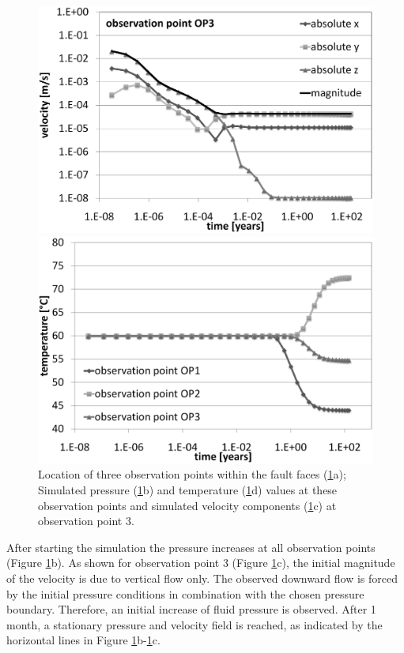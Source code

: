 \begin{figure}[htbp]
\begin{center}
\begin{minipage}{0.40\textwidth}
            \includegraphics[width=1\textwidth]{T/figures/2u2f_fig6c.eps}
        \end{minipage}
        \begin{minipage}{0.40\textwidth}
            \includegraphics[width=1\textwidth]{T/figures/2u2f_fig6d.eps}
        \end{minipage}
        \caption{Location of three observation points within the fault faces (\ref{fig6}a); Simulated pressure (\ref{fig6}b) and temperature (\ref{fig6}d) values at these observation points and simulated velocity components (\ref{fig6}c) at observation point 3.}
        \label{fig6}
    \end{center}
\end{figure}

After starting the simulation the pressure increases at all observation points (Figure \ref{fig6}b). As shown for observation point 3 (Figure \ref{fig6}c), the initial magnitude of the velocity is due to vertical flow only. The observed downward flow is forced by the initial pressure conditions in combination with the chosen pressure boundary. Therefore, an initial increase of fluid pressure is observed. After 1 month, a stationary pressure and velocity field is reached, as indicated by the horizontal lines in Figure \ref{fig6}b-\ref{fig6}c.

